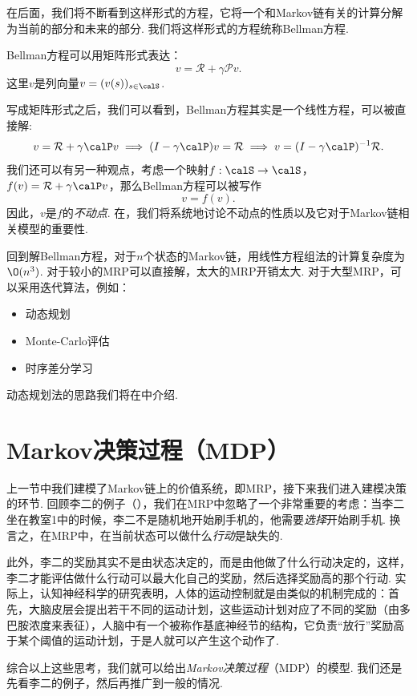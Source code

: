在后面，我们将不断看到这样形式的方程，它将一个和Markov链有关的计算分解为当前的部分和未来的部分. 我们将这样形式的方程统称Bellman方程. 

Bellman方程可以用矩阵形式表达：
        \[v = \mathcal R + \gamma \mathcal P v.\]
这里$v$是列向量$v=(v(s))_{s\in\calS}$.

写成矩阵形式之后，我们可以看到，Bellman方程其实是一个线性方程，可以被直接解:
\[
    v =\mathcal R + \gamma \calP v \implies (I-\gamma \calP)v = \mathcal R \implies v = (I-\gamma \calP)^{-1} \mathcal R.
\]
我们还可以有另一种观点，考虑一个映射$f:\calS\to \calS$，$f(v)=\mathcal R + \gamma \calP v$，那么Bellman方程可以被写作
\[v=f(v).\]
因此，$v$是$f$的\emph{不动点}. 在，我们将系统地讨论不动点的性质以及它对于Markov链相关模型的重要性.

回到解Bellman方程，对于$n$个状态的Markov链，用线性方程组法的计算复杂度为$\O(n^3)$. 对于较小的MRP可以直接解，太大的MRP开销太大. 对于大型MRP，可以采用迭代算法，例如：
\begin{itemize}
    \item {}动态规划
    \item {}Monte-Carlo评估
    \item {}时序差分学习
\end{itemize}
动态规划法的思路我们将在中介绍.

\section{Markov决策过程（MDP）}

上一节中我们建模了Markov链上的价值系统，即MRP，接下来我们进入建模决策的环节. 回顾李二的例子（），我们在MRP中忽略了一个非常重要的考虑：当李二坐在教室1中的时候，李二不是随机地开始刷手机的，他需要\emph{选择}开始刷手机. 换言之，在MRP中，在当前状态可以做什么\emph{行动}是缺失的. 

此外，李二的奖励其实不是由状态决定的，而是由他做了什么行动决定的，这样，李二才能评估做什么行动可以最大化自己的奖励，然后选择奖励高的那个行动. 实际上，认知神经科学的研究表明，人体的运动控制就是由类似的机制完成的：首先，大脑皮层会提出若干不同的运动计划，这些运动计划对应了不同的奖励（由多巴胺浓度来表征），人脑中有一个被称作基底神经节的结构，它负责“放行”奖励高于某个阈值的运动计划，于是人就可以产生这个动作了. 

综合以上这些思考，我们就可以给出\emph{Markov决策过程}（MDP）的模型. 我们还是先看李二的例子，然后再推广到一般的情况. 

